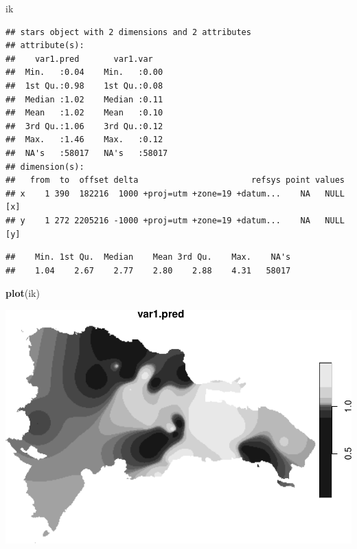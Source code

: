 \documentclass[11pt,]{article}
\newenvironment{Shaded}{\begin{snugshade}}{\end{snugshade}}
\newcommand{\KeywordTok}[1]{\textcolor[rgb]{0.13,0.29,0.53}{\textbf{#1}}}
\newcommand{\OperatorTok}[1]{\textcolor[rgb]{0.81,0.36,0.00}{\textbf{#1}}}
\newcommand{\NormalTok}[1]{#1}
\begin{document}
\begin{Shaded}
\begin{Highlighting}[]
\NormalTok{ik}
\end{Highlighting}
\end{Shaded}

\begin{verbatim}
## stars object with 2 dimensions and 2 attributes
## attribute(s):
##    var1.pred       var1.var     
##  Min.   :0.04    Min.   :0.00   
##  1st Qu.:0.98    1st Qu.:0.08   
##  Median :1.02    Median :0.11   
##  Mean   :1.02    Mean   :0.10   
##  3rd Qu.:1.06    3rd Qu.:0.12   
##  Max.   :1.46    Max.   :0.12   
##  NA's   :58017   NA's   :58017  
## dimension(s):
##   from  to  offset delta                       refsys point values    
## x    1 390  182216  1000 +proj=utm +zone=19 +datum...    NA   NULL [x]
## y    1 272 2205216 -1000 +proj=utm +zone=19 +datum...    NA   NULL [y]
\end{verbatim}

\begin{Shaded}
\end{Shaded}

\begin{verbatim}
##    Min. 1st Qu.  Median    Mean 3rd Qu.    Max.    NA's 
##    1.04    2.67    2.77    2.80    2.88    4.31   58017
\end{verbatim}

\begin{Shaded}
\begin{Highlighting}[]
\KeywordTok{plot}\NormalTok{(ik)}
\end{Highlighting}
\end{Shaded}

\includegraphics{proyecto_files/figure-latex/unnamed-chunk-28-1.pdf}
\end{document}
